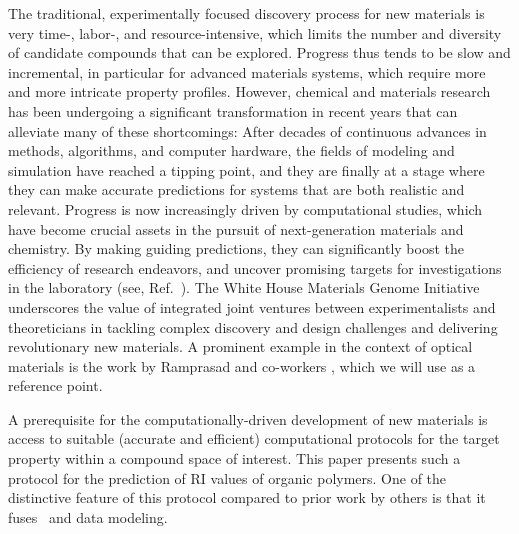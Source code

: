 The traditional, experimentally focused discovery process for new materials is very time-, labor-, and resource-intensive, which limits the number and diversity of candidate compounds that can be explored. Progress thus tends to be slow and incremental, in particular for advanced materials systems, which require more and more intricate property profiles.
However, chemical and materials research has been undergoing a significant transformation in recent years that can alleviate many of these shortcomings: After decades of continuous advances in methods, algorithms, and computer hardware, the fields of modeling and simulation have reached a tipping point, and they are finally at a stage where they can make accurate predictions for systems that are both realistic and relevant. Progress is now increasingly driven by computational studies, which have become crucial assets in the pursuit of next-generation materials and chemistry. By making guiding predictions, they can significantly boost the efficiency of research endeavors, and uncover promising targets for investigations in the laboratory (see, \eg  Ref.\ \cite{cep01,Sokolov2011,Hachmann2011,Olivares-Amaya2011,Amador-Bedolla2013,Hachmann2014,Pyzer-Knapp2015,Lopez2016}). The White House Materials Genome Initiative \cite{NationalMaterials2011} underscores the value of integrated joint ventures between experimentalists and theoreticians in tackling complex discovery and design challenges and delivering revolutionary new materials.
A prominent example in the context of optical materials is the work by Ramprasad and co-workers \cite{Huan2016,Sharma2014,Mannodi-Kanakkithodi2016}, which we will use as a reference point.

A prerequisite for the computationally-driven development of new materials is access to suitable (\ie  accurate and efficient) computational protocols for the target property within a compound space of interest. This paper presents such a protocol for the prediction of RI values of organic polymers. One of the distinctive feature of this protocol compared to prior work by others \cite{Huan2016,Sharma2014,Redmond2011,Park2011} is that it fuses \firstprinciples\  and data modeling. 

